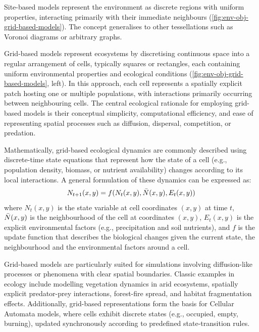 Site-based models represent the environment as discrete regions with uniform properties, interacting primarily with their immediate neighbours (\cref{fig:env-obj-grid-based-models}). The concept generalises to other tessellations such as Voronoi diagrams or arbitrary graphs.


Grid-based models represent ecosystems by discretising continuous space into a regular arrangement of cells, typically squares or rectangles, each containing uniform environmental properties and ecological conditions (\cref{fig:env-obj-grid-based-models}, left). In this approach, each cell represents a spatially explicit patch hosting one or multiple populations, with interactions primarily occurring between neighbouring cells. The central ecological rationale for employing grid-based models is their conceptual simplicity, computational efficiency, and ease of representing spatial processes such as diffusion, dispersal, competition, or predation.

Mathematically, grid-based ecological dynamics are commonly described using discrete-time state equations that represent how the state of a cell (e.g., population density, biomass, or nutrient availability) changes according to its local interactions. A general formulation of these dynamics can be expressed as:
\begin{align}
N_{t+1}(x,y) = f(N_t(x,y), \Bar{N}(x, y), E_t(x, y))
\end{align}
where $N_t(x, y)$ is the state variable at cell coordinates $(x, y)$ at time $t$, $\Bar{N}(x, y)$ is the neighbourhood of the cell at coordinates $(x, y)$, $E_t(x, y)$ is the explicit environmental factors (e.g., precipitation and soil nutrients), and $f$ is the update function that describes the biological changes given the current state, the neighbourhood and the environmental factors around a cell.

Grid-based models are particularly suited for simulations involving diffusion-like processes or phenomena with clear spatial boundaries. Classic examples in ecology include modelling vegetation dynamics in arid ecosystems, spatially explicit predator-prey interactions, forest-fire spread, and habitat fragmentation effects. Additionally, grid-based representations form the basis for Cellular Automata models, where cells exhibit discrete states (e.g., occupied, empty, burning), updated synchronously according to predefined state-transition rules.

